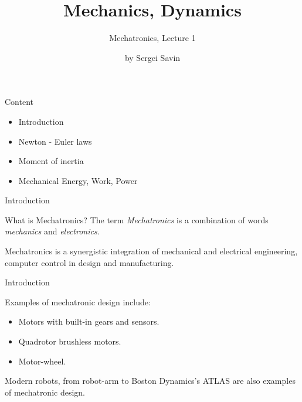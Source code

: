 \documentclass{beamer}
\title{Mechanics, Dynamics}
\subtitle{Mechatronics, Lecture 1}
\author{by Sergei Savin}
\date{\mydate}
\begin{document}
\maketitle



\begin{frame}{Content}
\begin{itemize}
\item Introduction
\item Newton - Euler laws
\item Moment of inertia
\item Mechanical Energy, Work, Power
\end{itemize}
\end{frame}


\begin{frame}{Introduction}
	\begin{flushleft}
		
		
		What is Mechatronics? The term \emph{Mechatronics} is a combination of words \emph{mechanics} and \emph{electronics}.
		
		\bigskip
		
		\begin{definition}
			Mechatronics is a synergistic integration of mechanical and electrical engineering, computer control in design and manufacturing. 
		\end{definition}
		
		
	\end{flushleft}
\end{frame}


\begin{frame}{Introduction}
	\begin{flushleft}
		
		
		Examples of mechatronic design include:
		
		\begin{itemize}
			\item Motors with built-in gears and sensors.
			
			\item Quadrotor brushless motors.
			
			\item Motor-wheel.
		\end{itemize}		
	
		\bigskip
		
		Modern robots, from robot-arm to Boston Dynamics's ATLAS are also examples of mechatronic design.
		
		
	\end{flushleft}
\end{frame}
\end{document}
